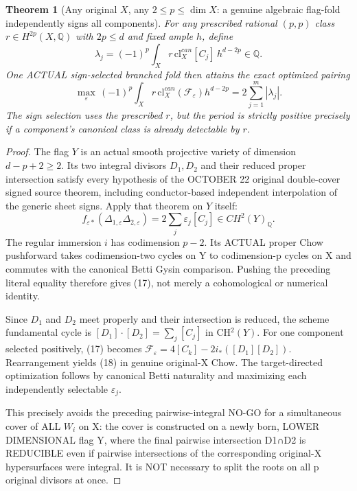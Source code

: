 \documentclass[11pt]{article}
\newtheorem{theorem}{Theorem}
\begin{document}
\begin{theorem}[Any original $X$, any $2\le p\le\dim X$:
a genuine algebraic flag-fold independently signs all components]
For any prescribed rational $(p,p)$ class
$r\in H^{2p}(X,\mathbb Q)$ with $2p\le d$
and fixed ample $h$, define
\[
 \lambda_j=(-1)^p
  \int_X r\,\mathrm{cl}^{can}_X[C_j]\,
                    h^{d-2p}\in\mathbb Q .
\]
One ACTUAL sign-selected branched fold then
attains the exact optimized pairing
\[
 \boxed{
 \max_{\varepsilon}\,
 (-1)^p\int_X r\,
     \mathrm{cl}^{can}_X(\mathcal F_\varepsilon)
               h^{d-2p}
       =2\sum_{j=1}^{m}|\lambda_j|.
 }                                                     \tag{19}
\]
The sign selection uses the prescribed $r$,
but the period is strictly positive precisely
if a component's canonical class is
already detectable by $r$.
\end{theorem}

\begin{proof}
The flag $Y$ is an actual smooth projective
variety of dimension $d-p+2\ge2$.
Its two integral divisors $D_1,D_2$ and
their reduced proper intersection satisfy
every hypothesis of the OCTOBER 22 original
double-cover signed source theorem,
including conductor-based independent
interpolation of the generic sheet signs.
Apply that theorem on $Y$ itself:
\[
  f_{\varepsilon*}
   (\Delta_{1,\varepsilon}\Delta_{2,\varepsilon})
     =2\sum_j\varepsilon_j[C_j]\in CH^2(Y)_{\mathbb Q}.
\]
The regular immersion $i$ has codimension
$p-2$. Its ACTUAL proper Chow pushforward
takes codimension-two cycles on Y to
codimension-p cycles on X and commutes
with the canonical Betti Gysin comparison.
Pushing the preceding literal equality
therefore gives (17), not merely a
cohomological or numerical identity.

Since $D_1$ and $D_2$ meet properly and
their intersection is reduced, the
scheme fundamental cycle is
$[D_1]\cdot[D_2]=\sum_j[C_j]$
in CH$^2(Y)$.
For one component selected positively,
(17) becomes
$\mathcal F_\varepsilon=
 4[C_k]-2i_*([D_1][D_2])$.
Rearrangement yields (18) in genuine
original-X Chow. The target-directed
optimization follows by canonical
Betti naturality and maximizing each
independently selectable $\varepsilon_j$.

This precisely avoids the preceding
pairwise-integral NO-GO for a simultaneous
cover of ALL $W_i$ on X: the cover is
constructed on a newly born, LOWER
DIMENSIONAL flag Y, where the final
pairwise intersection D1∩D2 is
REDUCIBLE even if pairwise intersections
of the corresponding original-X
hypersurfaces were integral.
It is NOT necessary to split the roots
on all p original divisors at once.
\end{proof}
\end{document}
